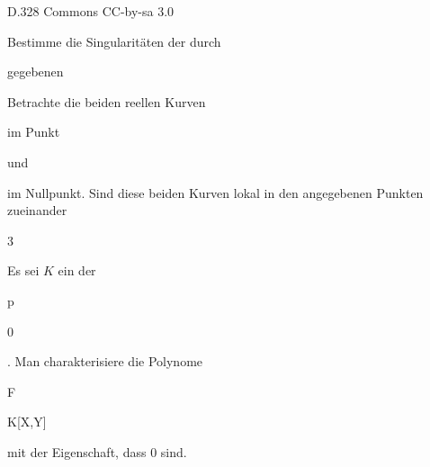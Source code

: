  {} {D.328} {Commons} {CC-by-sa 3.0} {}



{}

{


Bestimme die Singularitäten
 {} {}
der durch


 {  }


gegebenen



}

{} {}



{}

{


Betrachte die beiden reellen Kurven


 {  }


im Punkt

 und


 {  }


im Nullpunkt. Sind diese beiden Kurven lokal in den angegebenen Punkten zueinander


}

{} {}





{3}

{


Es sei $K$ ein
der


\mavergleichskette

{\vergleichskette

{p
}

{ \geq }{ 0
}

{  }{
}

{    }{
}

{   }{
}

}
{}{}{.}
Man charakterisiere die Polynome


\mavergleichskette

{\vergleichskette

{F
}

{ \in }{ K[X,Y]
}

{  }{
}

{    }{
}

{   }{
}

}
{}{}{}
mit der Eigenschaft, dass
$0$ sind.


}

